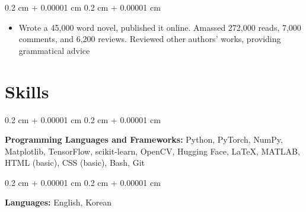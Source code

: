 \documentclass[10pt, letterpaper]{article}
\newenvironment{highlights}{
    \begin{itemize}[
        topsep=0.10 cm,
        parsep=0.10 cm,
        partopsep=0pt,
        itemsep=0pt,
        leftmargin=0.4 cm + 10pt
    ]
}{
    \end{itemize}
} %
\newenvironment{onecolentry}{
    \begin{adjustwidth}{
        0.2 cm + 0.00001 cm
    }{
        0.2 cm + 0.00001 cm
    }
}{
    \end{adjustwidth}
} %
\begin{document}
        \vspace{0.10 cm}
        \begin{onecolentry}
            \begin{highlights}
                \item Wrote a 45,000 word novel,  published it online. Amassed 272,000 reads, 7,000 comments, and 6,200 reviews. Reviewed other authors' works,  providing grammatical advice
            \end{highlights}
        \end{onecolentry}

        



    
    \section{Skills}



        
        \begin{onecolentry}
            \textbf{Programming Languages and Frameworks:} Python, PyTorch, NumPy, Matplotlib, TensorFlow, scikit-learn,  OpenCV, Hugging Face, \LaTeX, MATLAB, HTML (basic), CSS (basic), Bash, Git
        \end{onecolentry}

        \vspace{0.2 cm}

        \begin{onecolentry}
            \textbf{Languages:} English, Korean
        \end{onecolentry}

        \vspace{0.2 cm}



    
\end{document}

